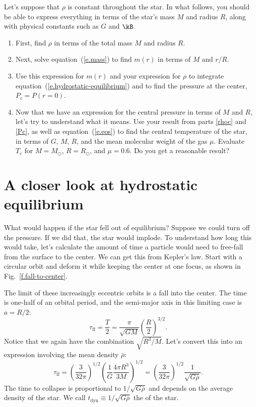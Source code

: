 \begin{exercisebox}
\label{ex.constant-density-star}
Let's suppose that $\rho$ is constant throughout the star. 
In what follows, you should be able to express everything in terms of the star's mass $M$ and radius $R$, along with physical constants such as $G$ and $\kB$.

\begin{enumerate}
\item\label{rhoc} First, find $\rho$ in terms of the total mass $M$ and radius $R$.

\item Next, solve equation~(\ref{e.mass}) to find $m(r)$ in terms of $M$ and $r/R$.

\item\label{Pc} Use this expression for $m(r)$ and your expression for $\rho$ to integrate equation~(\ref{e.hydrostatic-equilibrium}) and to find the pressure at the center, $P_{c} = P(r=0)$.

\item
Now that we have an expression for the central pressure in terms of $M$ and $R$, let's try to understand what it means. Use your result from parts \ref{rhoc} and \ref{Pc}, as well as equation~(\ref{e.eos}) to find the central temperature of the star, in terms of $G$, $M$, $R$, and the mean molecular weight of the gas $\mu$.  Evaluate $T_{c}$ for $M=M_{\odot}$, $R=R_{\odot}$, and $\mu = 0.6$.  Do you get a reasonable result?
\end{enumerate}
\end{exercisebox}

\section{A closer look at hydrostatic equilibrium}
\label{s.closer-look}

What would happen if the star fell out of equilibrium? Suppose we could turn off the pressure. If we did that, the star would implode. To understand how long this would take, let's calculate the amount of time a particle would need to free-fall from the surface to the center.  We can get this from Kepler's law. Start with a circular orbit and deform it while keeping the center at one focus, as shown in Fig.~\ref{f.fall-to-center}.  

The limit of these increasingly eccentric orbits is a fall into the center.  The time is one-half of an orbital period, and the semi-major axis in this limiting case is $a = R/2$:
\[
\tau_{\mathrm{ff}} = \frac{T}{2} = \frac{\pi}{\sqrt{GM}} \left(\frac{R}{2}\right)^{3/2}.
\]
Notice that we again have the combination $\sqrt{R^{3}/M}$.  Let's convert this into an expression involving the mean density $\bar{\rho}$:
\begin{equation}\label{e.tff}
\tau_{\mathrm{ff}} = \left(\frac{3}{32\pi}\right)^{1/2}\left(\frac{1}{G}\frac{4\pi R^{3}}{3M}\right)^{1/2} = \left(\frac{3}{32\pi}\right)^{1/2} \frac{1}{\sqrt{G\bar{\rho}}}.
\end{equation}
The time to collapse is proportional to $1/\sqrt{G\bar{\rho}}$ and depends on the average density of the star. We call $t_{\mathrm{dyn}} \equiv 1/\sqrt{G\bar{\rho}}$ the  of the star.


